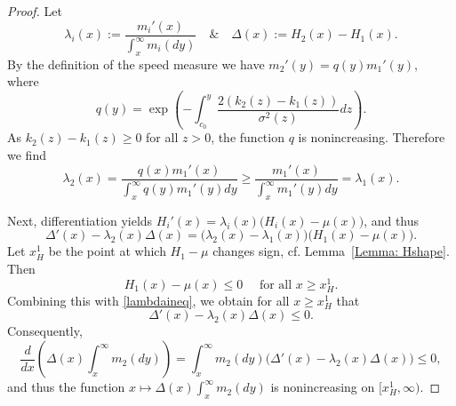 \documentclass[10pt,a4paper]{amsart}
\begin{document}
\begin{proof}
    Let 
    \begin{equation*}
       \lambda_i(x) := \frac{m_{i}'(x)}{\int_x^\infty m_{i}(dy)}\quad\& \quad  \Delta(x) := H_2(x)-H_1(x).
    \end{equation*}
By the definition of the speed measure we have $m_{2}'(y) = q(y)m_{1}'(y),$ where
    \begin{equation*}
        q(y) = \exp{\left(-\int^{y}_{c_0}\frac{2(k_2(z)-k_1(z))}{\sigma^2(z)}dz \right)}.
    \end{equation*}
    As $k_2(z)-k_1(z) \geq 0$ for all $z>0$, the function $q$ is nonincreasing. Therefore we find
    \begin{equation}\label{lambdaineq}
        \lambda_2(x) = \frac{q(x)m_{1}'(x)}{\int_x^\infty q(y)m_{1}'(y)dy} \geq \frac{m_{1}'(x)}{\int_x^\infty m_{1}'(y)dy} = \lambda_1(x).
    \end{equation}
    
    Next, differentiation yields $H_i'(x) =  \lambda_i(x) \big(H_i(x)-\mu(x)\big)$, and thus
    \begin{equation*}
        \Delta'(x)-\lambda_2(x)\Delta(x) = \big( \lambda_2(x)-\lambda_1(x)\big)\big(H_1(x)-\mu(x) \big).
    \end{equation*}
    Let $x_H^1$ be the point at which $H_1-\mu$ changes sign, cf. Lemma~\ref{Lemma: Hshape}. Then
    \begin{equation*}
        H_1(x)-\mu(x) \leq 0 \quad \text{ for all } x \geq x_H^1.
    \end{equation*}
    Combining this with \eqref{lambdaineq}, we obtain for all $x \geq x_H^1$ that 
    \begin{equation} \label{Eq: DeltaIneq}
        \Delta'(x)-\lambda_2(x)\Delta(x) \leq 0.
    \end{equation}
    Consequently,
    \begin{equation*}
        \frac{d}{dx} \left( \Delta(x)\int_x^\infty m_{2}(dy) \right) = \int_x^\infty m_{2}(dy) \big(\Delta'(x)-\lambda_2(x)\Delta(x)\big) \leq 0,
    \end{equation*}
    and thus the function $x \mapsto \Delta(x) \int_x^\infty m_{2}(dy)$ is nonincreasing on $[x_H^1,\infty)$. 
    

\end{proof}
\end{document}
